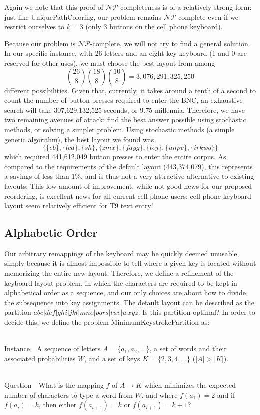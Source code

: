 \documentclass[runningheads]{llncs}
\newcommand{\NP}{\ensuremath{\mathcal{NP}}}
\newcommand{\Instance}{{\sc Instance~}}
\newcommand{\Question}{~\\
{\sc Question~}}
\begin{document}
Again we note that this proof of \NP-completeness is of a relatively strong form: just like {\sc UniquePathColoring}, our problem remains \NP-complete even if we restrict ourselves to $k=3$ (only 3 buttons on the cell phone keyboard).

Because our problem is \NP-complete, we will not try to find a general solution.  In our specific instance, with 26 letters and an eight key keyboard (1 and 0 are reserved for other uses),  we must choose the best layout from among $$\binom{26}{8} \binom{18}{8} \binom{10}{8} = 3,076,291,325,250$$ different possibilities.  Given that, currently, it takes around a tenth of a second to count the number of button presses required to enter the BNC, an exhaustive search will take 307,629,132,525 seconds, or 9.75 millennia.  Therefore, we have two remaining avenues of attack: find the best answer possible using stochastic methods, or solving a simpler problem.  Using stochastic methods (a simple genetic algorithm), the best layout we found was 
$$\{\{eb\}, \{lcd\}, \{sh\}, \{zmx\}, \{fayg\}, \{toj\}, \{unpv\}, \{irkwq\}\}$$
which required 441,612,049 button presses to enter the entire corpus.   As compared to the requirements of the default layout (443,374,079), this represents a savings of less than 1\%, and is thus not a very attractive alternative to existing layouts.  This low amount of improvement, while not good news for our proposed reordering, is excellent news for all current cell phone users: cell phone keyboard layout seem relatively efficient for T9 text entry!

\subsection{Alphabetic Order}

Our arbitrary remappings of the keyboard may be quickly deemed
unusable, simply because it is almost impossible to tell where a given key is located without memorizing the entire new layout.  Therefore, we define a refinement of the keyboard layout problem, in which the
characters are required to be kept in alphabetical order as a sequence, and our
only choices are about how to divide the subsequence into key assignments.  The
default layout can be described as the partition
$abc|def|ghi|jkl|mno|pqrs|tuv|wxyz$.  Is this partition optimal?  In order to
decide this, we define the problem {\sc MinimumKeystrokePartition} as:
\begin{prob}[{\sc MinimumKeystrokePartition}]~\\
\label{thm:minpartition}
\Instance\ A sequence of letters $A = \{a_1, a_2, \ldots \}$, a set of words and their associated probabilities $W$, and a set of keys $K = \{2, 3, 4, \ldots \}$ ($|A| > |K|$).

\Question\ What is the mapping $f$ of $A \to K$ which minimizes the expected number of characters to type a word from $W$, and where $f(a_1) = 2$ and if $f(a_i) = k$, then either $f(a_{i+1}) = k$ or $f(a_{i+1}) = k+1$?
\end{prob}
\end{document}

